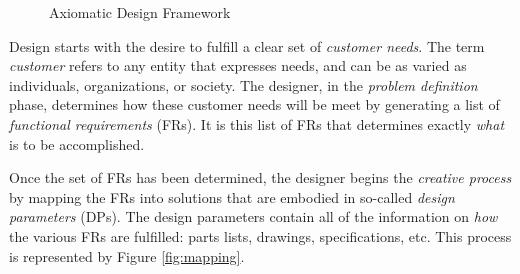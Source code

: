 \begin{figure}[h]
  \label{fig:design}
  \begin{center}
  \end{center}
  \caption{Axiomatic Design Framework}
\end{figure}

Design starts with the desire to fulfill a clear set of \emph{customer needs}.  The term \emph{customer} refers to
any entity that expresses needs, and can be as varied as individuals, organizations, or society.  The designer, in
the \emph{problem definition} phase, determines how these customer needs will be meet by generating a list of
\emph{functional requirements} (FRs).  It is this list of FRs that determines exactly \emph{what} is to be
accomplished.

Once the set of FRs has been determined, the designer begins the \emph{creative process} by mapping the FRs into
solutions that are embodied in so-called \emph{design parameters} (DPs).  The design parameters contain all of the
information on \emph{how} the various FRs are fulfilled: parts lists, drawings, specifications, etc.  This process
is represented by Figure \ref{fig:mapping}.

